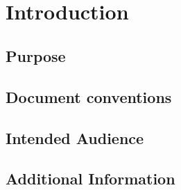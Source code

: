\documentclass[10pt]{article}
\title{
\vspace{2in}
\textmd{\textbf{\projecttitle} \\}
\vspace{5in}
}
\author{\textbf{\hmwkAuthorName}}
\date{} %
\begin{document}
\maketitle








\newpage

\tableofcontents

\newpage













\section{Introduction}

\subsection{Purpose}

\lipsum[10]

\subsection{Document conventions}

\lipsum[10]

\subsection{Intended Audience}

\lipsum[10]

\subsection{Additional Information}
\end{document}
